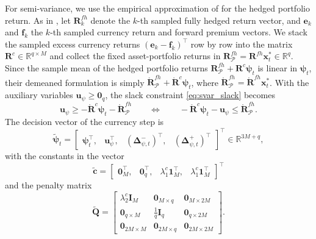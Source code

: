 For semi-variance, we use the empirical approximation of  for the hedged portfolio return. As
in , let $\bm{R}^{fh}_k$ denote the $k$-th sampled fully hedged return vector, and
$\bm{e}_k$ and $\bm{f}_k$ the $k$-th sampled currency return and forward premium vectors. We stack the sampled excess
currency returns $(\bm{e}_k - \bm{f}_k)^\top$ row by row into the matrix $\bm{R}^c \in \mathbb{R}^{q \times M}$ and
collect the fixed asset-portfolio returns in $\bm{R}^{fh}_{\mathcal{P}} = \bm{R}^{fh} \bm{x}_t^* \in \mathbb{R}^q$. Since the
sample mean of the hedged portfolio returns $\bm{R}^{fh}_{\mathcal{P}} + \bm{R}^c \bm{\psi}_t$ is linear in $\bm{\psi}_t$, their
demeaned formulation is simply $\mathring{\bm{R}}^{fh}_{\mathcal{P}} + \mathring{\bm{R}}^c \bm{\psi}_t$, where
$\mathring{\bm{R}}^{fh}_{\mathcal{P}} = \mathring{\bm{R}}^{fh} \bm{x}_t^*$. With the auxiliary variables
$\bm{u}_\psi \ge \bm{0}_q$, the slack constraint \eqref{eq:svar_slack} becomes
\begin{equation*}
    \bm{u}_\psi \ge -\mathring{\bm{R}}^c \bm{\psi}_t - \mathring{\bm{R}}^{fh}_{\mathcal{P}}
    \qquad \Longleftrightarrow \qquad
    -\mathring{\bm{R}}^c \bm{\psi}_t - \bm{u}_\psi \le \mathring{\bm{R}}^{fh}_{\mathcal{P}}.
\end{equation*}
The decision vector of the currency step is
\begin{equation*}
    \tilde{\bm{\psi}}_t = \begin{bmatrix} \bm{\psi}_t^\top,& \bm{u}_\psi^\top,& (\bm{\Delta}_{\psi,t}^-)^\top,&
    (\bm{\Delta}_{\psi,t}^+)^\top \end{bmatrix}^\top \in \mathbb{R}^{3M+q},
\end{equation*}
with the constants in the vector
\begin{equation*}
    \tilde{\bm{c}} = \begin{bmatrix} \bm{0}_M^\top,& \bm{0}_q^\top,& \lambda_1^c \bm{1}_M^\top,&
    \lambda_1^c \bm{1}_M^\top \end{bmatrix}^\top
\end{equation*}
and the penalty matrix
\begin{equation*}
    \tilde{\bm{Q}} =
    \begin{bmatrix}
        \lambda_2^c \bm{I}_M & \bm{0}_{M \times q} & \bm{0}_{M \times 2M} \\
        \bm{0}_{q \times M} & \tfrac{1}{q} \bm{I}_q & \bm{0}_{q \times 2M} \\
        \bm{0}_{2M \times M} & \bm{0}_{2M \times q} & \bm{0}_{2M \times 2M}
    \end{bmatrix}.
\end{equation*}
